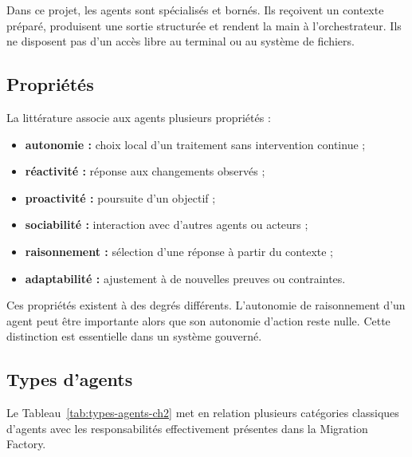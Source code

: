 Dans ce projet, les agents sont spécialisés et bornés. Ils reçoivent un contexte préparé, produisent une sortie structurée et rendent la main à l'orchestrateur. Ils ne disposent pas d'un accès libre au terminal ou au système de fichiers.

\subsection{Propriétés}

La littérature associe aux agents plusieurs propriétés \cite{wooldridge-book,weiss-mas} :

\begin{itemize}
    \item \textbf{autonomie :} choix local d'un traitement sans intervention continue ;
    \item \textbf{réactivité :} réponse aux changements observés ;
    \item \textbf{proactivité :} poursuite d'un objectif ;
    \item \textbf{sociabilité :} interaction avec d'autres agents ou acteurs ;
    \item \textbf{raisonnement :} sélection d'une réponse à partir du contexte ;
    \item \textbf{adaptabilité :} ajustement à de nouvelles preuves ou contraintes.
\end{itemize}

Ces propriétés existent à des degrés différents. L'autonomie de raisonnement d'un agent peut être importante alors que son autonomie d'action reste nulle. Cette distinction est essentielle dans un système gouverné.

\subsection{Types d'agents}

Le Tableau~\ref{tab:types-agents-ch2} met en relation plusieurs catégories classiques d'agents avec les responsabilités effectivement présentes dans la Migration Factory.

